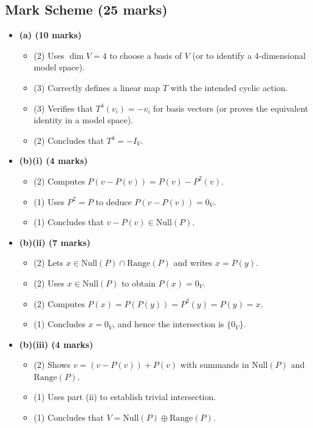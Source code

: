 \documentclass[12pt]{article}
\begin{document}
\subsection{Mark Scheme (25 marks)}
\begin{itemize}[leftmargin=1.6em]
  \item \textbf{(a) (10 marks)}
  \begin{itemize}[leftmargin=1.6em]
    \item (2) Uses \(\dim V=4\) to choose a basis of \(V\) (or to identify a \(4\)-dimensional model space).
    \item (3) Correctly defines a linear map \(T\) with the intended cyclic action.
    \item (3) Verifies that \(T^4(v_i)=-v_i\) for basis vectors (or proves the equivalent identity in a model space).
    \item (2) Concludes that \(T^4=-I_V\).
  \end{itemize}

  \item \textbf{(b)(i) (4 marks)}
  \begin{itemize}[leftmargin=1.6em]
    \item (2) Computes \(P(v-P(v))=P(v)-P^2(v)\).
    \item (1) Uses \(P^2=P\) to deduce \(P(v-P(v))=0_V\).
    \item (1) Concludes that \(v-P(v)\in \mathrm{Null}(P)\).
  \end{itemize}

  \item \textbf{(b)(ii) (7 marks)}
  \begin{itemize}[leftmargin=1.6em]
    \item (2) Lets \(x\in \mathrm{Null}(P)\cap \mathrm{Range}(P)\) and writes \(x=P(y)\).
    \item (2) Uses \(x\in \mathrm{Null}(P)\) to obtain \(P(x)=0_V\).
    \item (2) Computes \(P(x)=P(P(y))=P^2(y)=P(y)=x\).
    \item (1) Concludes \(x=0_V\), and hence the intersection is \(\{0_V\}\).
  \end{itemize}

  \item \textbf{(b)(iii) (4 marks)}
  \begin{itemize}[leftmargin=1.6em]
    \item (2) Shows \(v=(v-P(v))+P(v)\) with summands in \(\mathrm{Null}(P)\) and \(\mathrm{Range}(P)\).
    \item (1) Uses part (ii) to establish trivial intersection.
    \item (1) Concludes that \(V=\mathrm{Null}(P)\oplus \mathrm{Range}(P)\).
  \end{itemize}
\end{itemize}
\end{document}
